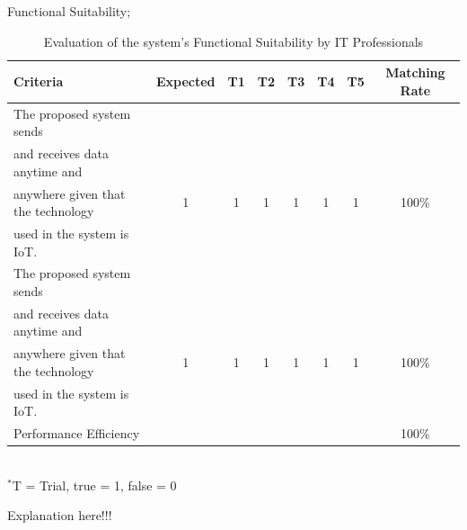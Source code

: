\indent\indent Functional Suitability; \\
\begin{table}[h!]
\caption{Evaluation of the system’s Functional Suitability by IT Professionals}
\vspace{-1em}
\begin{center}
\fontsize{10}{12}\selectfont
\begin{tabular}{|| l c c c c c c c ||} 
 \hline
 Criteria & Expected & T1 & T2 & T3 & T4 & T5 & Matching Rate \\ [0.5ex] 
 \hline\hline
The proposed system sends &  &  &  &  &  &  &  \\
and receives data anytime and &  &  &  &  &  &  &  \\
anywhere given that the technology & 1 & 1 & 1 & 1 & 1 & 1 & 100\% \\
used in the system is IoT. &  &  &  &  &  &  &  \\ 
\hline
The proposed system sends &  &  &  &  &  &  &  \\
and receives data anytime and &  &  &  &  &  &  &  \\
anywhere given that the technology & 1 & 1 & 1 & 1 & 1 & 1 & 100\% \\
used in the system is IoT. &  &  &  &  &  &  &  \\ 
\hline
Performance Efficiency &  &  &  &  &  &  & 100\% \\ 
\hline
\end{tabular} \\
\footnotesize{\hspace{-10cm}$^*$T = Trial, true = 1, false = 0}
\end{center}
\end{table} 

Explanation here!!! \lipsum[1] \\

